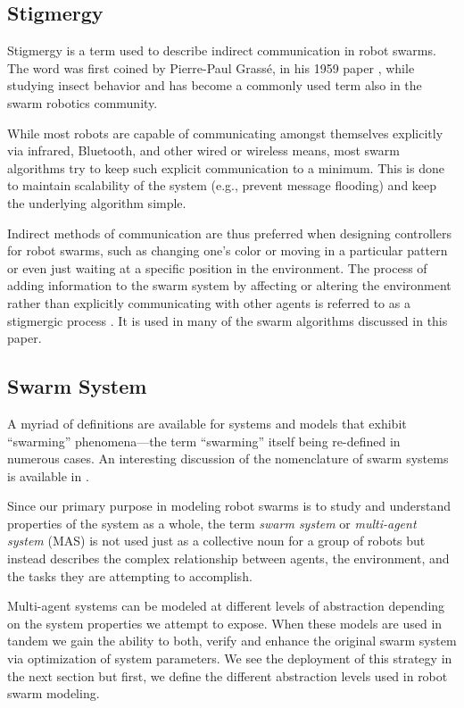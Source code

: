 \documentclass[12pt]{book}
\begin{document}
\subsection{Stigmergy}
Stigmergy is a term used to describe indirect communication in robot swarms. The word was first coined by Pierre-Paul Grass\'e, in his 1959 paper \cite{Grasse1959}, while studying insect behavior and has become a commonly used term also in the swarm robotics community. 

While most robots are capable of communicating amongst themselves explicitly via infrared, Bluetooth\texttrademark, and other wired or wireless means, most swarm algorithms try to keep such explicit communication to a minimum. This is done to maintain scalability of the system (e.g., prevent message flooding) and keep the underlying algorithm simple.

Indirect methods of communication are thus preferred when designing controllers for robot swarms, such as changing one's color or moving in a particular pattern or even just waiting at a specific position in the environment. The process of adding information to the swarm system by affecting or altering the environment rather than explicitly communicating with other agents is referred to as a stigmergic process \cite{Balch2005}. It is used in many of the swarm algorithms discussed in this paper.


\subsection{Swarm System}
A myriad of definitions are available for systems and models that exhibit ``swarming'' phenomena---the term ``swarming'' itself being re-defined in numerous cases. An interesting discussion of the nomenclature of swarm systems is available in \cite{Beni2005,Beni2005a}.

Since our primary purpose in modeling robot swarms is to study and understand properties of the system as a whole, the term \emph{swarm system} or \emph{multi-agent system} (MAS) is not used just as a collective noun for a group of robots but instead describes the complex relationship between agents, the environment, and the tasks they are attempting to accomplish.

Multi-agent systems can be modeled at different levels of abstraction depending on the system properties we attempt to expose. When these models are used in tandem we gain the ability to both, verify and enhance the original swarm system via optimization of system parameters. We see the deployment of this strategy in the next section but first, we define the different abstraction levels used in robot swarm modeling.
\end{document}
